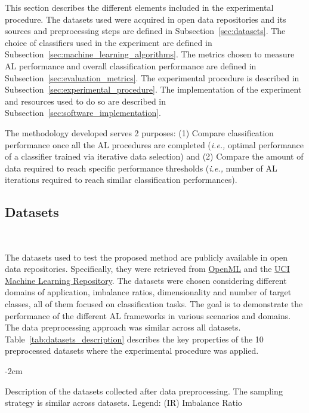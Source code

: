 \documentclass[parskip=full]{scrartcl}
\begin{document}
This section describes the different elements included in the experimental
procedure. The datasets used were acquired in open data repositories and its
sources and preprocessing steps are defined in Subsection~\ref{sec:datasets}.
The choice of classifiers used in the experiment are defined in
Subsection~\ref{sec:machine_learning_algorithms}. The metrics chosen to
measure AL performance and overall classification performance are defined in
Subsection~\ref{sec:evaluation_metrics}. The experimental procedure is
described in Subsection~\ref{sec:experimental_procedure}. The implementation
of the experiment and resources used to do so are described in
Subsection~\ref{sec:software_implementation}.

The methodology developed serves 2 purposes: (1) Compare classification
performance once all the AL procedures are completed (\textit{i.e.,} optimal
performance of a classifier trained via iterative data selection) and (2)
Compare the amount of data required to reach specific performance thresholds
(\textit{i.e.,} number of AL iterations required to reach similar
classification performances).

\subsection{Datasets}~\label{sec:datasets}

The datasets used to test the proposed method are publicly available in open
data repositories. Specifically, they were retrieved from
\href{https://www.openml.org/}{OpenML} and the
\href{https://archive.ics.uci.edu/}{UCI Machine Learning Repository}. The
datasets were chosen considering different domains of application, imbalance
ratios, dimensionality and number of target classes, all of them focused on
classification tasks. The goal is to demonstrate the performance of the
different AL frameworks in various scenarios and domains. The data
preprocessing approach was similar across all datasets.
Table~\ref{tab:datasets_description} describes the key properties of the 10
preprocessed datasets where the experimental procedure was applied. 

\begin{table}[H]
    \centering
    \addtolength{\leftskip} {-2cm}
    \addtolength{\rightskip}{-2cm}
    \caption{\label{tab:datasets_description}
        Description of the datasets collected after data preprocessing. The
        sampling strategy is similar across datasets. Legend: (IR) Imbalance
        Ratio
    }
\end{table}
\end{document}
